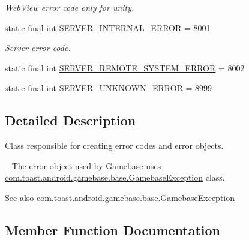 \begin{DoxyCompactItemize}
\begin{DoxyCompactList}\small\item\em Web\+View error code only for unity. \end{DoxyCompactList}\item 
static final int \hyperlink{classcom_1_1toast_1_1android_1_1gamebase_1_1base_1_1_gamebase_error_abb8bcf6617c8d01173161a51a0668ca4}{S\+E\+R\+V\+E\+R\+\_\+\+I\+N\+T\+E\+R\+N\+A\+L\+\_\+\+E\+R\+R\+OR} = 8001
\begin{DoxyCompactList}\small\item\em Server error code. \end{DoxyCompactList}\item 
static final int \hyperlink{classcom_1_1toast_1_1android_1_1gamebase_1_1base_1_1_gamebase_error_acc3672296c208fd1bea93617c2f7ddeb}{S\+E\+R\+V\+E\+R\+\_\+\+R\+E\+M\+O\+T\+E\+\_\+\+S\+Y\+S\+T\+E\+M\+\_\+\+E\+R\+R\+OR} = 8002
\item 
static final int \hyperlink{classcom_1_1toast_1_1android_1_1gamebase_1_1base_1_1_gamebase_error_ad6e53269e4ff5378bdc18dc5e2e621f8}{S\+E\+R\+V\+E\+R\+\_\+\+U\+N\+K\+N\+O\+W\+N\+\_\+\+E\+R\+R\+OR} = 8999
\end{DoxyCompactItemize}


\subsection{Detailed Description}
Class responsible for creating error codes and error objects. 

~\newline
 The error object used by \hyperlink{classcom_1_1toast_1_1android_1_1gamebase_1_1_gamebase}{Gamebase} uses \hyperlink{classcom_1_1toast_1_1android_1_1gamebase_1_1base_1_1_gamebase_exception}{com.\+toast.\+android.\+gamebase.\+base.\+Gamebase\+Exception} class.

\begin{DoxySeeAlso}{See also}
\hyperlink{classcom_1_1toast_1_1android_1_1gamebase_1_1base_1_1_gamebase_exception}{com.\+toast.\+android.\+gamebase.\+base.\+Gamebase\+Exception} 
\end{DoxySeeAlso}


\subsection{Member Function Documentation}
\mbox{\label{classcom_1_1toast_1_1android_1_1gamebase_1_1base_1_1_gamebase_error_ae1e31671405d6d3c4660aacf9d9dd3c5}} 
